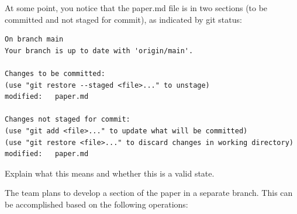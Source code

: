 \documentclass[12pt]{scrartcl}
\begin{document}
\hrulefill

\vspace{0.5cm}

\hrulefill

\vspace{0.5cm}

\hrulefill

\vspace{0.5cm}

\hrulefill

\vspace{0.5cm}
\newpage
\noindent
At some point, you notice that the paper.md file is in two sections (to be committed and not staged for commit), as indicated by git status:

\begin{verbatim}
On branch main
Your branch is up to date with 'origin/main'.

Changes to be committed:
(use "git restore --staged <file>..." to unstage)
modified:   paper.md

Changes not staged for commit:
(use "git add <file>..." to update what will be committed)
(use "git restore <file>..." to discard changes in working directory)
modified:   paper.md
\end{verbatim}
\noindent
Explain what this means and whether this is a valid state.

\vspace{0.5cm}

\hrulefill

\vspace{0.5cm}

\hrulefill

\vspace{0.5cm}

\noindent
The team plans to develop a section of the paper in a separate branch. This can be accomplished based on the following operations:

\vspace{0.5cm}

\hrulefill

\vspace{0.5cm}

\hrulefill

\vspace{0.5cm}

\hrulefill

\vspace{0.5cm}

\hrulefill

\vspace{0.5cm}
\end{document}

